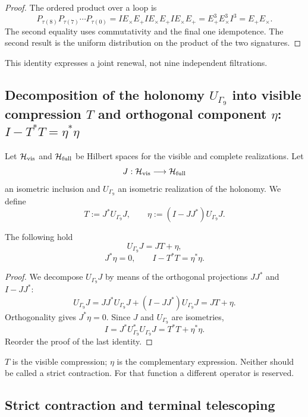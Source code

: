 \begin{proof}
The ordered product over a loop is
\[
 P_{\tau(8)}P_{\tau(7)}\cdots P_{\tau(0)}
 =I E_\times E_+ I E_\times E_+ I E_\times E_+
 =E_+^3E_\times^3I^3=E_+E_\times.
\]
The second equality uses commutativity and the final one idempotence. The
second result is the uniform distribution on the product of the two
signatures.
\end{proof}

This identity expresses a joint renewal, not nine independent filtrations.

\subsection{Decomposition of the holonomy \(U_{\Gamma_9}\) into visible compression \(T\) and orthogonal component \(\eta\): \(I-T^*T=\eta^*\eta\)}

Let \(\mathcal H_{\rm vis}\) and \(\mathcal H_{\rm full}\) be Hilbert spaces for the visible and complete realizations. Let
\[
 J:\mathcal H_{\rm vis}\longrightarrow\mathcal H_{\rm full}
\]
an isometric inclusion and
\(U_{\Gamma_9}\) an isometric realization of the holonomy. We define
\[
 T:=J^*U_{\Gamma_9}J,
 \qquad
 \eta:=(I-JJ^*)U_{\Gamma_9}J.
\]

\begin{theorem}
\label{p12-83-c7-s1:thm:conexion-compresion-expresion}
The following hold
\[
 \boxed{U_{\Gamma_9}J=JT+\eta,}
\]
\[
 J^*\eta=0,
 \qquad
 \boxed{I-T^*T=\eta^*\eta.}
\]
\end{theorem}

\begin{proof}
We decompose \(U_{\Gamma_9}J\) by means of the orthogonal projections
\(JJ^*\) and \(I-JJ^*\):
\[
 U_{\Gamma_9}J
 =JJ^*U_{\Gamma_9}J+(I-JJ^*)U_{\Gamma_9}J
 =JT+\eta.
\]
Orthogonality gives \(J^*\eta=0\). Since \(J\) and
\(U_{\Gamma_9}\) are isometries,
\[
 I=J^*U_{\Gamma_9}^*U_{\Gamma_9}J
 =T^*T+\eta^*\eta.
\]
Reorder the proof of the last identity.
\end{proof}

\(T\) is the visible compression; \(\eta\) is the complementary expression.
Neither should be called a strict contraction. For that function a
different operator is reserved.

\subsection{Strict contraction and terminal telescoping}

